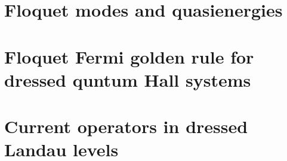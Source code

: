 \documentclass[%
 reprint,
 amsmath,amssymb,
 aps,
prb,
]{revtex4-2}
\begin{document}
\section{\label{appendix_b} Floquet modes and quasienergies}


\section{\label{appendix_c} Floquet Fermi golden rule for dressed quntum Hall systems}


\section{\label{appendix_d} Current operators in dressed Landau levels}


\nocite{*}

\end{document}
